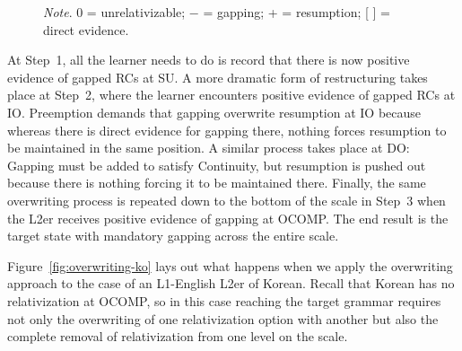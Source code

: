 \begin{figure}
\begin{mybox}
\par\vspace{6pt}
\vspace{-6pt} 
\end{mybox}
\vspace{-6pt} 
\textit{Note}. 0 = unrelativizable; − = gapping; + = resumption; [ ] = direct evidence.\par
{}\vspace{-12pt}
\end{figure}

At Step~1, all the learner needs to do is record that there is now positive evidence of gapped RCs at SU. A more dramatic form of restructuring takes place at Step~2, where the learner encounters positive evidence of gapped RCs at IO. Preemption demands that gapping overwrite resumption at IO because whereas there is direct evidence for gapping there, nothing forces resumption to be maintained in the same position. A similar process takes place at DO: Gapping must be added to satisfy Continuity, but resumption is pushed out because there is nothing forcing it to be maintained there. Finally, the same overwriting process is repeated down to the bottom of the scale in Step~3 when the L2er receives positive evidence of gapping at OCOMP. The end result is the target state with mandatory gapping across the entire scale.

Figure~\ref{fig:overwriting-ko} lays out what happens when we apply the overwriting approach to the case of an L1-English L2er of Korean. Recall that Korean has no relativization at OCOMP, so in this case reaching the target grammar requires not only the overwriting of one relativization option with another but also the complete removal of relativization from one level on the scale.

